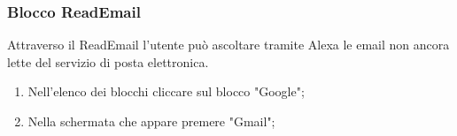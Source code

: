 \subsubsection{Blocco ReadEmail}
Attraverso il ReadEmail l'utente può ascoltare tramite Alexa le email non ancora lette del servizio di posta elettronica.
\begin{enumerate}
	\item Nell'elenco dei blocchi cliccare sul blocco "Google";
	\item Nella schermata che appare premere "Gmail";
	\begin{figure}[!ht]
		\centering

\end{figure}
\end{enumerate}
